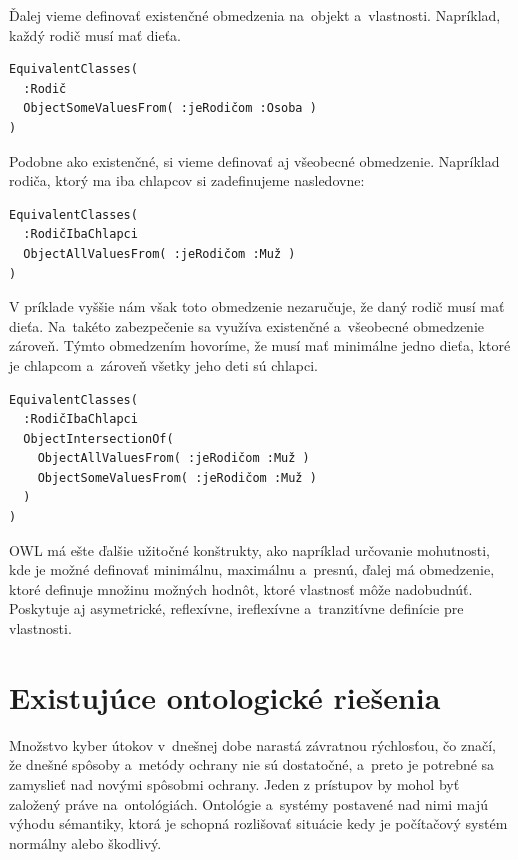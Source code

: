 \documentclass[12pt, a4paper, oneside]{book}
\begin{document}
Ďalej vieme definovať existenčné obmedzenia na~objekt a~vlastnosti. Napríklad, každý rodič musí mať dieťa.
\begin{verbatim}
EquivalentClasses(
  :Rodič 
  ObjectSomeValuesFrom( :jeRodičom :Osoba )
)
\end{verbatim}


Podobne ako existenčné, si vieme definovať aj všeobecné obmedzenie. Napríklad rodiča, ktorý ma iba chlapcov si zadefinujeme nasledovne:
\begin{verbatim}
EquivalentClasses(
  :RodičIbaChlapci 
  ObjectAllValuesFrom( :jeRodičom :Muž )
)
\end{verbatim}


V príklade vyššie nám však toto obmedzenie nezaručuje, že daný rodič musí mať dieťa. Na~takéto zabezpečenie sa využíva existenčné a~všeobecné obmedzenie zároveň. Týmto obmedzením hovoríme, že musí mať minimálne jedno dieťa, ktoré je chlapcom a~zároveň všetky jeho deti sú chlapci.
\begin{verbatim}
EquivalentClasses(
  :RodičIbaChlapci 
  ObjectIntersectionOf(
    ObjectAllValuesFrom( :jeRodičom :Muž )
    ObjectSomeValuesFrom( :jeRodičom :Muž )
  )
)
\end{verbatim}


OWL má ešte ďalšie užitočné konštrukty, ako napríklad určovanie mohutnosti, kde je možné definovať minimálnu, maximálnu a~presnú, ďalej má obmedzenie, ktoré definuje množinu možných hodnôt, ktoré vlastnosť môže nadobudnúť. Poskytuje aj asymetrické, reflexívne, ireflexívne a~tranzitívne definície pre vlastnosti.




\chapter{Existujúce ontologické riešenia}
Množstvo kyber útokov v~dnešnej dobe narastá závratnou rýchlosťou, čo značí, že dnešné spôsoby a~metódy ochrany nie sú dostatočné, a~preto je potrebné sa zamyslieť nad novými spôsobmi ochrany. Jeden z prístupov by mohol byť založený práve na~ontológiách. Ontológie a~systémy postavené nad nimi majú výhodu sémantiky, ktorá je schopná rozlišovať situácie kedy je počítačový systém normálny alebo škodlivý.
\end{document}
